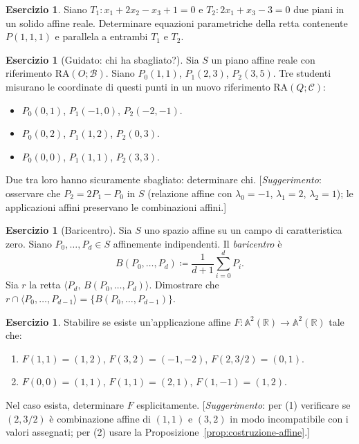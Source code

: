 \documentclass[11pt, a4paper]{book}
\theoremstyle{definition}
\newtheorem{esercizio}[definizione]{Esercizio}
\theoremstyle{plain}
\theoremstyle{remark}
\newcommand{\R}{\mathbb{R}}
\newcommand{\RA}{\mathrm{RA}}   %
\begin{document}
\begin{esercizio}
Siano $T_1 \colon x_1 + 2x_2 - x_3 + 1 = 0$ e $T_2 \colon 2x_1 + x_3 - 3 = 0$ due piani in un solido affine reale. Determinare equazioni parametriche della retta contenente $P(1,1,1)$ e parallela a entrambi $T_1$ e $T_2$.
\end{esercizio}

\begin{esercizio}[Guidato: chi ha sbagliato?]
Sia $S$ un piano affine reale con riferimento $\RA(O;\mathcal{B})$. Siano $P_0(1,1)$, $P_1(2,3)$, $P_2(3,5)$. Tre studenti misurano le coordinate di questi punti in un nuovo riferimento $\RA(Q;\mathcal{C})$:
\begin{itemize}
  \item[(A)] $P_0(0,1)$, $P_1(-1,0)$, $P_2(-2,-1)$.
  \item[(M)] $P_0(0,2)$, $P_1(1,2)$, $P_2(0,3)$.
  \item[(L)] $P_0(0,0)$, $P_1(1,1)$, $P_2(3,3)$.
\end{itemize}
Due tra loro hanno sicuramente sbagliato: determinare chi. [\emph{Suggerimento}: osservare che $P_2 = 2P_1 - P_0$ in $S$ (relazione affine con $\lambda_0 = -1$, $\lambda_1 = 2$, $\lambda_2 = 1$); le applicazioni affini preservano le combinazioni affini.]
\end{esercizio}

\begin{esercizio}[Baricentro]
Sia $S$ uno spazio affine su un campo di caratteristica zero. Siano $P_0,\ldots,P_d \in S$ affinemente indipendenti. Il \emph{baricentro} è
\[
  B(P_0,\ldots,P_d) \coloneqq \frac{1}{d+1}\sum_{i=0}^d P_i.
\]
Sia $r$ la retta $\langle P_d,\, B(P_0,\ldots,P_d) \rangle$. Dimostrare che $r \cap \langle P_0,\ldots,P_{d-1} \rangle = \{B(P_0,\ldots,P_{d-1})\}$.
\end{esercizio}

\begin{esercizio}
Stabilire se esiste un'applicazione affine $F \colon \mathbb{A}^2(\R) \to \mathbb{A}^2(\R)$ tale che:
\begin{enumerate}
  \item $F(1,1) = (1,2)$, $F(3,2) = (-1,-2)$, $F(2,3/2) = (0,1)$.
  \item $F(0,0) = (1,1)$, $F(1,1) = (2,1)$, $F(1,-1) = (1,2)$.
\end{enumerate}
Nel caso esista, determinare $F$ esplicitamente. [\emph{Suggerimento}: per (1) verificare se $(2,3/2)$ è combinazione affine di $(1,1)$ e $(3,2)$ in modo incompatibile con i valori assegnati; per (2) usare la Proposizione~\ref{prop:costruzione-affine}.]
\end{esercizio}
\end{document}
